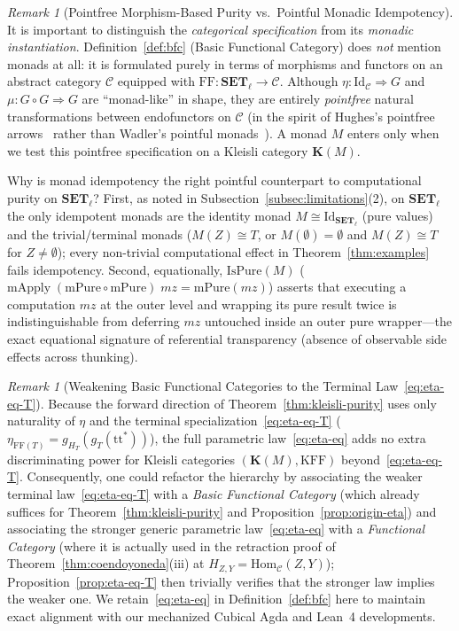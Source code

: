 \documentclass[11pt,a4paper]{article}
\theoremstyle{definition}
\theoremstyle{remark}
\newtheorem{remark}[theorem]{Remark}
\newcommand{\Set}{\mathbf{SET}}
\newcommand{\Hom}{\mathrm{Hom}}
\newcommand{\Id}{\mathrm{Id}}
\newcommand{\FF}{\mathrm{FF}}
\newcommand{\KFF}{\mathrm{KFF}}
\newcommand{\K}{\mathbf{K}}
\newcommand{\ttstar}{\mathrm{tt}^*}
\begin{document}
\begin{remark}[Pointfree Morphism-Based Purity vs.\ Pointful Monadic Idempotency]\label{rem:pointfree-vs-pointful}
It is important to distinguish the \emph{categorical specification} from its \emph{monadic
instantiation}. Definition~\ref{def:bfc} (Basic Functional Category) does \emph{not} mention monads at
all: it is formulated purely in terms of morphisms and functors on an abstract category $\mathcal{C}$
equipped with $\FF : \Set_\ell \to \mathcal{C}$. Although $\eta : \Id_{\mathcal{C}} \Rightarrow G$ and
$\mu : G \circ G \Rightarrow G$ are ``monad-like'' in shape, they are entirely \emph{pointfree}
natural transformations between endofunctors on $\mathcal{C}$ (in the spirit of Hughes's pointfree
arrows~\cite{Hughes2000} rather than Wadler's pointful monads~\cite{Wadler1995}). A monad $M$ enters
only when we test this pointfree specification on a Kleisli category $\K(M)$.

Why is monad idempotency the right pointful counterpart to computational purity on $\Set_\ell$?
First, as noted in Subsection~\ref{subsec:limitations}(2), on $\Set_\ell$ the only idempotent monads
are the identity monad $M \cong \Id_{\Set_\ell}$ (pure values) and the trivial/terminal monads
($M(Z) \cong T$, or $M(\emptyset) = \emptyset$ and $M(Z) \cong T$ for $Z \neq \emptyset$); every
non-trivial computational effect in Theorem~\ref{thm:examples} fails idempotency. Second,
equationally, $\mathrm{IsPure}(M)$ ($\mathrm{mApply}\;(\mathrm{mPure} \circ \mathrm{mPure})\;mz =
\mathrm{mPure}(mz)$) asserts that executing a computation $mz$ at the outer level and wrapping its
pure result twice is indistinguishable from deferring $mz$ untouched inside an outer pure wrapper---the
exact equational signature of referential transparency (absence of observable side effects across
thunking).
\end{remark}

\begin{remark}[Weakening Basic Functional Categories to the Terminal Law~\eqref{eq:eta-eq-T}]\label{rem:weakening-bfc}
Because the forward direction of Theorem~\ref{thm:kleisli-purity} uses only naturality of $\eta$ and
the terminal specialization~\eqref{eq:eta-eq-T} ($\eta_{\FF(T)} = g_{H_T}(g_T(\ttstar))$), the full
parametric law~\eqref{eq:eta-eq} adds no extra discriminating power for Kleisli categories
$(\K(M), \KFF)$ beyond~\eqref{eq:eta-eq-T}. Consequently, one could refactor the hierarchy by
associating the weaker terminal law~\eqref{eq:eta-eq-T} with a \emph{Basic Functional Category}
(which already suffices for Theorem~\ref{thm:kleisli-purity} and Proposition~\ref{prop:origin-eta})
and associating the stronger generic parametric law~\eqref{eq:eta-eq} with a \emph{Functional
Category} (where it is actually used in the retraction proof of Theorem~\ref{thm:coendoyoneda}(iii)
at $H_{Z,Y} = \Hom_{\mathcal{C}}(Z, Y)$); Proposition~\ref{prop:eta-eq-T} then trivially verifies that
the stronger law implies the weaker one. We retain~\eqref{eq:eta-eq} in Definition~\ref{def:bfc} here
to maintain exact alignment with our mechanized Cubical Agda and Lean~4 developments.
\end{remark}
\end{document}
